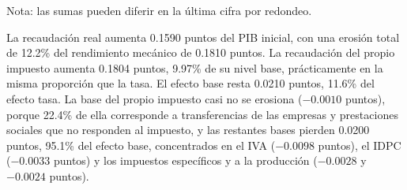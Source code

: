 \documentclass[11pt]{article}
\begin{document}
\begin{table}[H]
\centering
\caption{Recaudación y descomposición del impacto fiscal del aumento del PIT (porcentaje y puntos del PIB nominal inicial)}
\label{tab:pit-descomposicion}
\small
{}
\par\smallskip
\begin{minipage}{\textwidth}
\footnotesize Nota: las sumas pueden diferir en la última cifra por redondeo.
\end{minipage}
\end{table}

La recaudación real aumenta 0.1590 puntos del PIB inicial, con una erosión total de 12.2\% del rendimiento mecánico de 0.1810 puntos. La recaudación del propio impuesto aumenta 0.1804 puntos, 9.97\% de su nivel base, prácticamente en la misma proporción que la tasa. El efecto base resta 0.0210 puntos, 11.6\% del efecto tasa. La base del propio impuesto casi no se erosiona ($-0.0010$ puntos), porque 22.4\% de ella corresponde a transferencias de las empresas y prestaciones sociales que no responden al impuesto, y las restantes bases pierden 0.0200 puntos, 95.1\% del efecto base, concentrados en el IVA ($-0.0098$ puntos), el IDPC ($-0.0033$ puntos) y los impuestos específicos y a la producción ($-0.0028$ y $-0.0024$ puntos).
\end{document}
